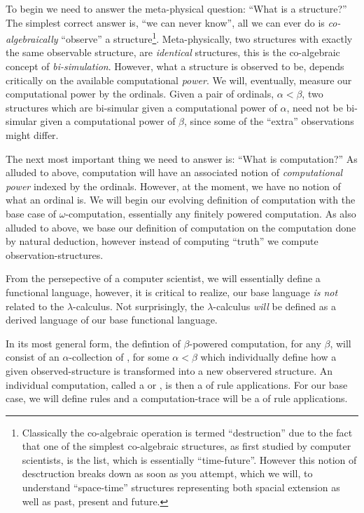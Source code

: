 To begin we need to answer the meta-physical question: ``What is a structure?''
The simplest correct answer is, ``we can never know'', all we can ever do is
\emph{co-algebraically} ``observe'' a structure\footnote{Classically the
co-algebraic operation is termed ``destruction'' due to the fact that one of the
simplest co-algebraic structures, as first studied by computer scientists, is
the list, which is essentially ``time-future''. However this notion of
desctruction breaks down as soon as you attempt, which we will, to understand
``space-time'' structures representing both spacial extension as well as past,
present and future.}. Meta-physically, two structures with exactly the same
observable structure, are \emph{identical} structures, this is the co-algebraic
concept of \emph{bi-simulation}. However, what a structure is observed to be,
depends critically on the available computational \emph{power}. We will,
eventually, measure our computational power by the ordinals. Given a pair of
ordinals, $\alpha < \beta$, two structures which are bi-simular given a
computational power of $\alpha$, need not be bi-simular given a computational
power of $\beta$, since some of the ``extra'' observations might differ.

The next most important thing we need to answer is: ``What is computation?'' As
alluded to above, computation will have an associated notion of
\emph{computational power} indexed by the ordinals. However, at the moment, we
have no notion of what an ordinal is. We will begin our evolving definition of
computation with the base case of $\omega$-computation, essentially any finitely
powered computation. As also alluded to above, we base our definition of
computation on the computation done by natural deduction, however instead of
computing ``truth'' we compute observation-structures.

From the persepective of a computer scientist, we will essentially define a
functional language, however, it is critical to realize, our base language
\emph{is not} related to the $\lambda$-calculus. Not surprisingly, the
$\lambda$-calculus \emph{will} be defined as a derived language of our base
functional language.

In its most general form, the defintion of $\beta$-powered computation, for any
$\beta$, will consist of an $\alpha$-collection of , for some
$\alpha < \beta$ which individually define how a given observed-structure is
transformed into a new observered structure. An individual computation, called a
 or , is then a
 of rule applications. For our base case, we will define
 rules and a computation-trace will be a  of
rule applications.

